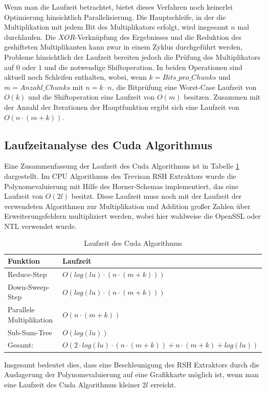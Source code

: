 {Wenn man die Laufzeit betrachtet, bietet dieses Verfahren noch keinerlei Optimierung hinsichtlich Parallelisierung. Die Hauptschleife, in der die Multiplikation mit jedem Bit des Multiplikators erfolgt, wird insgesamt $n$ mal durchlaufen. Die $XOR$-Verknüpfung des Ergebnisses und die Reduktion des geshifteten Multiplikanten kann zwar in einem Zyklus durchgeführt werden, Probleme hinsichtlich der Laufzeit bereiten jedoch die Prüfung des Multiplikators auf $0$ oder $1$ und die notwendige Shiftoperation. In beiden Operationen sind aktuell noch Schleifen enthalten, wobei, wenn $k = Bits\_pro\_Chunks$ und $m = Anzahl\_Chunks$ mit $n=k \cdot n$, die Bitprüfung eine Worst-Case Laufzeit von $O(k)$ und die Shiftoperation eine Laufzeit von $O(m)$ besitzen. Zusammen mit der Anzahl der Iterationen der Hauptfunktion ergibt sich eine Laufzeit von $O(n \cdot (m+k))$.

\subsection{Laufzeitanalyse des Cuda Algorithmus}
Eine Zusammenfassung der Laufzeit des Cuda Algorithmus ist in Tabelle \ref{table:lzcuda} dargestellt. Im CPU Algorithmus des Trevisan RSH Extraktors wurde die Polynomevaluierung mit Hilfe des Horner-Schemas implementiert, das eine Laufzeit von $O(2l)$ besitzt. Diese Laufzeit muss noch mit der Laufzeit der verwendeten Algorithmen zur Multiplikation und Addition großer Zahlen über Erweiterungsfeldern multipliziert werden, wobei hier wahlweise die OpenSSL oder NTL verwendet wurde.

\begin{table}
\centering
\begin{tabular}{ll}
\toprule
Funktion & Laufzeit \\
\midrule
Reduce-Step & $O(log(lu) \cdot (n \cdot (m+k)))$ \\
Down-Sweep-Step & $O(log(lu) \cdot (n \cdot (m+k)))$ \\
Parallele Multiplikation & $O(n \cdot (m+k))$ \\
Sub-Sum-Tree & $O(log(lu))$ \\
\midrule
Gesamt: & $O(2 \cdot log(lu) \cdot (n \cdot (m+k)) + n \cdot (m+k) + log(lu))$ \\
\bottomrule
\end{tabular}
\caption{Laufzeit des Cuda Algorithmus}
\label{table:lzcuda}
\end{table}

Insgesamt bedeutet dies, dass eine Beschleunigung des RSH Extraktors durch die Auslagerung der Polynomevaluierung auf eine Grafikkarte möglich ist, wenn man eine Laufzeit des Cuda Algorithmus kleiner $2l$ erreicht.

}
